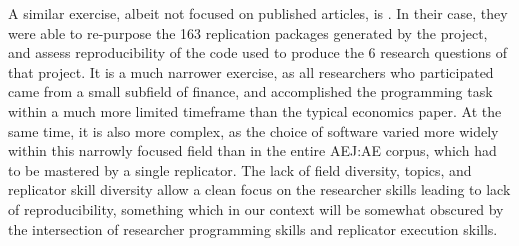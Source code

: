 A similar exercise, albeit not focused on published articles, is \citet{perignon2022}. In their case, they were able to re-purpose the 163 replication packages generated by the \citet{menkveld2023} project, and assess reproducibility of the code used to produce the 6 research questions of that project. It is a much narrower exercise, as all researchers who participated came from a small subfield of finance, and accomplished the programming task within a much more limited timeframe than the typical economics paper. At the same time, it is also more complex, as the choice of software varied more widely within this narrowly focused field than in the entire \ac{AEJ:AE} corpus, which had to be mastered by a single replicator. The lack of field diversity, topics, and replicator skill diversity allow a clean focus on the researcher skills leading to lack of reproducibility, something which in our context will be somewhat obscured by the intersection of researcher programming skills and replicator execution skills.
